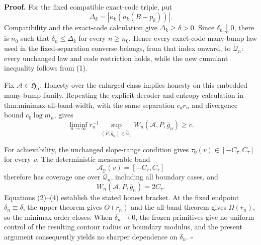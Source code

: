 \textbf{Proof.}
For the fixed compatible exact-code triple, put
\[
 \Delta_k=|\kappa_k(a_k(B-p_k))|. \tag{1}
\]
Compatibility and the exact-code calculation give \(\Delta_k\ge\delta>0\).  Since \(\delta_n\downarrow0\), there is \(n_0\) such that \(\delta_n\le\Delta_k\) for every \(n\ge n_0\).  Hence every exact-code many-bump law used in the fixed-separation converse belongs, from that index onward, to \(\widetilde{\mathcal Q}_n\): every unchanged law and code restriction holds, while the new cumulant inequality follows from (1).

Fix \(\mathcal A\in\widetilde{\mathfrak H}_\alpha\).  Honesty over the enlarged class implies honesty on this embedded many-bump family.  Repeating the explicit decoder and entropy calculation in \(\text{thm:minimax-all-band-width}\), with the same separation \(c_dr_n\) and divergence bound \(c_0\log m_n\), gives
\[
 \liminf_{n\to\infty}r_n^{-1}
 \sup_{(P,\bar g_n)\in\widetilde{\mathcal Q}_n}
 W_n(\mathcal A,P,\bar g_n)\ge c. \tag{2}
\]

For achievability, the unchanged slope-range condition gives
\(\tau_0(v)\in[-C_\tau,C_\tau]\) for every \(v\).  The deterministic measurable band
\[
 \mathcal A_n(v)=[-C_\tau,C_\tau] \tag{3}
\]
therefore has coverage one over \(\widetilde{\mathcal Q}_n\), including all boundary cases, and
\[
 W_n(\mathcal A,P,\bar g_n)=2C_\tau. \tag{4}
\]
Equations (2)--(4) establish the stated honest bracket.  At the fixed endpoint \(\delta_n\equiv\delta\), the upper theorem gives \(O(r_n)\) and the all-band theorem gives \(\Omega(r_n)\), so the minimax order closes.  When \(\delta_n\to0\), the frozen primitives give no uniform control of the resulting contour radius or boundary modulus, and the present argument consequently yields no sharper dependence on \(\delta_n\). \(\square\)